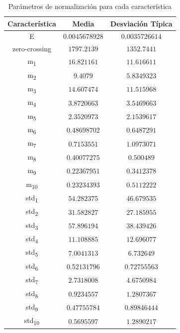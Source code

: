 \documentclass[12pt]{article}
\begin{document}
\newpage

\begin{table}[h!]
	\caption{Parámetros de normalización para cada característica}
	\centering
		\begin{tabular}{||c c c||}
			\hline
			Característica & Media & Desviación Típica  \\ [0.5ex]
			\hline\hline
			E & $0.0045678928$ & $0.0035726614$ \\
			\hline
			zero-crossing & $1797.2139$ & $1352.7441$ \\
			\hline
			m\textsubscript{1} & $16.821161$ & $11.616611$ \\
			\hline
			m\textsubscript{2} & $9.4079$ & $5.8349323$ \\
			\hline
			m\textsubscript{3} & $14.607474$ & $11.515968$ \\
			\hline
			m\textsubscript{4} & $3.8720663$ & $3.5469663$ \\
			\hline
			m\textsubscript{5} & $2.3520973$ & $2.1539617$ \\
			\hline
			m\textsubscript{6} & $0.48698702$ & $0.6487291$ \\
			\hline
			m\textsubscript{7} & $0.7153551$ & $1.0973071$ \\
			\hline
			m\textsubscript{8} & $0.40077275$ & $0.500489$ \\
			\hline
			m\textsubscript{9} & $0.22367951$ & $0.3412378$ \\
			\hline
			m\textsubscript{10} & $0.23234393$ & $0.5112222$ \\
			\hline
			std\textsubscript{1} & $54.282375$ & $46.679535$ \\
			\hline
			std\textsubscript{2} & $31.582827$ & $27.185955$ \\
			\hline
			std\textsubscript{3} & $57.896194$ & $38.439426$ \\
			\hline
			std\textsubscript{4} & $11.108885$ & $12.696077$ \\
			\hline
			std\textsubscript{5} & $7.0041313$ & $6.732649$ \\
			\hline
			std\textsubscript{6} & $0.52131796$ & $0.72755563$ \\
			\hline
			std\textsubscript{7} & $2.7318008$ & $4.6750984$ \\
			\hline
			std\textsubscript{8} & $0.9234557$ & $1.2807367$ \\
			\hline
			std\textsubscript{9} & $0.47755784$ & $0.89846444$ \\
			\hline
			std\textsubscript{10} & $0.5695597$ & $1.2890217$ \\

\end{tabular}
\end{table}
\end{document}
